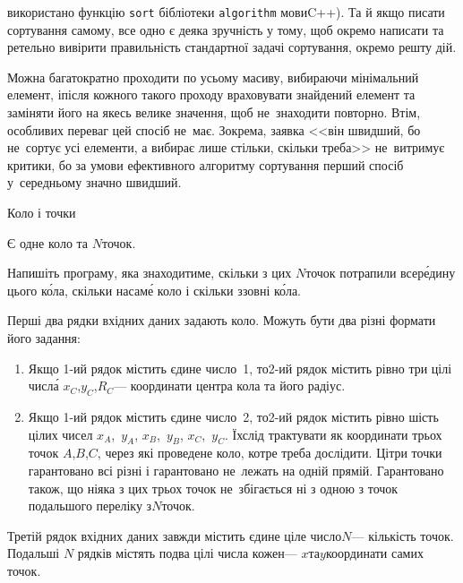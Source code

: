 \documentclass[14pt,a4paper]{extarticle}
\begin{document}
 використано функцію \verb"sort" бібліотеки \verb"algorithm" мови\nolinebreak[3] C++). Та й якщо писати сортування самому, все одно є деяка зручність у тому, щоб окремо написати та ретельно вивірити правильність стандартної задачі сортування, окремо решту дій.

Можна багатократно проходити по усьому масиву, вибираючи мінімальний елемент, і\nolinebreak[3] після кожного такого проходу враховувати знайдений елемент та заміняти його на якесь велике значення, щоб не~знаходити повторно. Втім, особливих переваг цей спосіб не~має. Зокрема, заявка <<він швидший, бо не~сортує усі елементи, а вибирає лише стільки, скільки треба>> не~витримує критики, бо за умови ефективного алгоритму сортування перший спосіб у~середньому значно швидший.


\begin{problemAllDefault}{Коло і точки}

Є одне коло та $N$\nolinebreak[3] точок. 

\Task	Напишіть програму, яка знаходитиме, скільки з цих $N$\nolinebreak[3] точок потрапили всер\'{е}\-дину цього к\'{о}ла, скільки на\nolinebreak[3] сам\'{е} коло і скільки ззовні к\'{о}ла.


\InputFile  Перші два рядки вхідних даних задають коло. Можуть бути два різні формати його задання:
\begin{enumerate}
\item
Якщо \mbox{1-ий} рядок містить єдине число~1, то\nolinebreak[3] \mbox{2-ий} рядок містить рівно три цілі числ\'{а} $x_C$,\nolinebreak[3] $y_C$,\nolinebreak[2] $R_C$\nolinebreak[3] --- координати центра кола та його радіус.
\item
Якщо \mbox{1-ий} рядок містить єдине число~2, то\nolinebreak[3] \mbox{2-ий} рядок містить рівно шість цілих чисел $x_A$,~$y_A$, $x_B$,~$y_B$, $x_C$,~$y_C$. Їх\nolinebreak[2] слід трактувати як координати трьох точок $A$,\nolinebreak[3] $B$,\nolinebreak[3] $C$, через які проведене коло, котре треба дослідити. Ці\nolinebreak[2] три точки гарантовано всі різні і гарантовано не~лежать на одній прямій. Гарантовано також, що ніяка з цих трьох точок не~збігається ні з одною з точок подальшого переліку з\nolinebreak[3] $N$\nolinebreak[3] точок.
\end{enumerate}

Третій рядок вхідних даних завжди містить єдине ціле число\nolinebreak[3] $N$\nolinebreak[3] --- кількість точок. Подальші $N$ рядків містять по\nolinebreak[2] два цілі числа кожен\nolinebreak[3] --- $x$\nolinebreak[3] та\nolinebreak[1] $y$\nolinebreak[2] координати самих точок.


\end{problemAllDefault}
\end{document}
